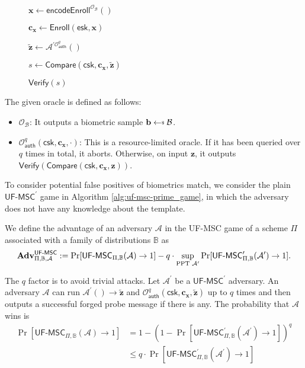 \begin{figure}[h]
\begin{multicols}{2}
\begin{minipage}[t]{0.9\linewidth}
\begin{algorithm}[H]
\begin{algorithmic}[1]
		\State $\mathbf{x} \gets \textsf{encodeEnroll}^{\mathcal{O}_{\mathcal{B}}}()$

		\State $\mathbf{c_x} \gets \textsf{Enroll}(\textsf{esk}, \mathbf{x})$

		\State ${\mathbf{\tilde{z}}} \gets \mathcal{A}^{\prime \mathcal{O}_\textsf{auth}^{q}}()$

		\State $s \gets \textsf{Compare}( \textsf{csk}, \mathbf{c_x}, \mathbf{\tilde{z}} )$

		\State \Return $\textsf{Verify}(s)$
	\end{algorithmic}
	\end{algorithm}
	\end{minipage}
\end{multicols}
\label{fig:uf-msc_game}
\end{figure}


The given oracle is defined as follows:

\begin{itemize}
	\item $\mathcal{O}_{\mathcal{B}}$: It outputs a biometric sample $\mathbf{b} \getsdollar \mathcal{B}$.

	\item $\mathcal{O}_\textsf{auth}^{q}(\textsf{csk}, \mathbf{c_x}, \cdot)$: This is a resource-limited oracle. If it has been queried over $q$ times in total, it aborts. Otherwise, on input $\mathbf{z}$, it outputs $\textsf{Verify}(\textsf{Compare}(\textsf{csk}, \mathbf{c_x}, \mathbf{z}))$.
\end{itemize}


To consider potential false positives of biometrics match, we consider the plain $\textsf{UF-MSC}^\prime$ game in Algorithm \ref{alg:uf-msc-prime_game}, in which the adversary does not have any knowledge about the template.

We define the advantage of an adversary $\mathcal{A}$ in the \textsf{UF-MSC} game of a scheme $\Pi$ associated with a family of distributions $\mathbb{B}$ as
\[
	\mathbf{Adv}^{\textsf{UF-MSC}}_{\Pi, \mathbb{B}, \mathcal{A}} := \Pr[{\textsf{UF-MSC}}_{\Pi, \mathbb{B}}(\mathcal{A}) \to 1] -
	q\cdot \sup_{\text{PPT } \mathcal{A}^\prime} \Pr[\textsf{UF-MSC}^\prime_{\Pi, \mathbb{B}}(\mathcal{A}^\prime) \to 1].
\]

The $q$ factor is to avoid trivial attacks.
Let $\mathcal{A}^\prime$ be a $\textsf{UF-MSC}^\prime$ adversary.
An adversary $\mathcal{A}$ can run $\mathcal{A}^\prime() \to \mathbf{\tilde{z}}$ and $\mathcal{O}_{\textsf{auth}}^q (\textsf{csk}, \mathbf{c_x}, \mathbf{\tilde{z}})$ up to $q$ times and then outputs a successful forged probe message if there is any.
The probability that $\mathcal{A}$ wins is
\begin{align*}
	\Pr[{\textsf{UF-MSC}}_{\Pi, \mathbb{B}}(\mathcal{A}) \to 1] 
	&= 1 - (1 - \Pr[\textsf{UF-MSC}^\prime_{\Pi, \mathbb{B}}(\mathcal{A}^\prime) \to 1])^q \\
	&\leq q \cdot \Pr[\textsf{UF-MSC}^\prime_{\Pi, \mathbb{B}}(\mathcal{A}^\prime) \to 1]
\end{align*}

